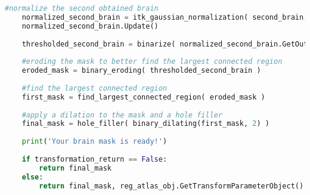 \documentclass{standalone}
\begin{document}
\begin{lstlisting}[language=python, caption=Brain Extraction Function, label=skull_stripping]
    #normalize the second obtained brain
    normalized_second_brain = itk_gaussian_normalization( second_brain, cast_filter.GetOutput() )
    normalized_second_brain.Update()
    
    thresholded_second_brain = binarize( normalized_second_brain.GetOutput(), -3, 1.5 )  
    
    #eroding the mask to better find the largest connected region
    eroded_mask = binary_eroding( thresholded_second_brain )
    
    #find the largest connected region
    first_mask = find_largest_connected_region( eroded_mask )
    
    #apply a dilation to the mask and a hole filler
    final_mask = hole_filler( binary_dilating(first_mask, 2) )
    
    print('Your brain mask is ready!')
    
    if transformation_return == False:
        return final_mask
    else:
        return final_mask, reg_atlas_obj.GetTransformParameterObject()
\end{lstlisting}
\end{document}
